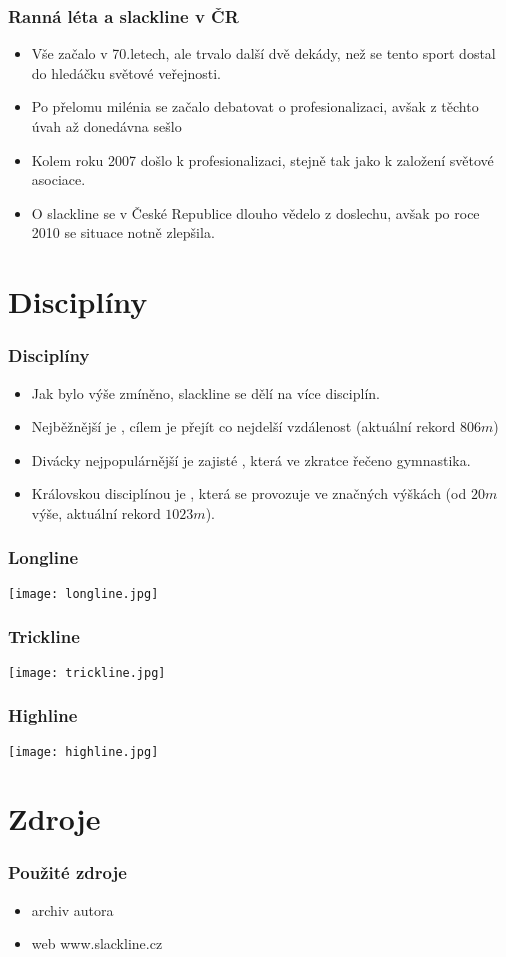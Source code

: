 \documentclass{beamer}
\begin{document}
\begin{frame}
  \frametitle{Ranná léta a slackline v ČR}
  
  \begin{itemize}
		\item Vše začalo v 70.letech, ale trvalo další dvě dekády, než se tento sport dostal do hledáčku světové veřejnosti.
		\item Po přelomu milénia se začalo debatovat o profesionalizaci, avšak z těchto úvah až donedávna sešlo
		\item Kolem roku 2007 došlo k profesionalizaci, stejně tak jako k založení světové asociace.
		\item O slackline se v České Republice dlouho vědelo z doslechu, avšak po roce 2010 se situace notně zlepšila.
	\end{itemize}
\end{frame}

\section{Disciplíny}

\begin{frame}
  \frametitle{Disciplíny}
  
  \begin{itemize}
		\item Jak bylo výše zmíněno, slackline se dělí na více disciplín.
		\item Nejběžnější je , cílem je přejít co nejdelší vzdálenost (aktuální rekord $806m$)
		\item Divácky nejpopulárnější je zajisté , která ve zkratce řečeno gymnastika.
		\item Královskou disciplínou je , která se provozuje ve značných výškách (od $20m$ výše, aktuální rekord $1023m$).
  \end{itemize}
\end{frame}

\begin{frame}
  \frametitle{Longline}
  
  \texttt{[image: longline.jpg]}
\end{frame}

\begin{frame}
  \frametitle{Trickline}
  
  \texttt{[image: trickline.jpg]}
\end{frame}

\begin{frame}
  \frametitle{Highline}
  
  \texttt{[image: highline.jpg]}
\end{frame}

\section{Zdroje}

\begin{frame}
  \frametitle{Použité zdroje}
  
  \begin{itemize}
		\item archiv autora
		\item web www.slackline.cz
	\end{itemize}
\end{frame}
\end{document}
